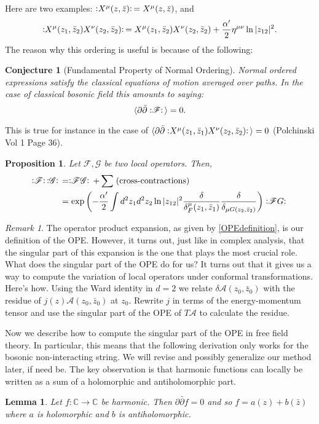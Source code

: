 \documentclass{report}
\theoremstyle{plain}
\newtheorem{lemma}[theorem]{Lemma}
\newtheorem{proposition}[theorem]{Proposition}
\newtheorem{conjecture}[theorem]{Conjecture}
\theoremstyle{definition}
\theoremstyle{remark}
\newtheorem*{remark}{Remark}
\newcommand{\FR}[2]{\frac{#1}{#2}}
\newcommand{\ms}{\mathscr}
\newcommand{\di}{\partial}
\newcommand{\NO}[1]{\vcentcolon\mathrel{#1}\vcentcolon\,}
\newcommand{\bC}{\mathbb{C}}
\begin{document}
Here are two examples: $\NO{X^\mu(z,\bar z)} = X^\mu(z,\bar z)$,
and
\begin{align}
\label{normalorder-example}
\NO{X^\mu(z_1,\bar z_2) X^\nu(z_2,\bar z_2)} = X^\mu(z_1,\bar
z_2) X^\nu(z_2,\bar z_2) + \FR{\alpha'}{2}\eta^{\mu\nu}\ln|z_{12}|^2.
\end{align}
The reason why this ordering is useful is because of the following:
\begin{conjecture}[Fundamental Property of Normal Ordering]
\label{fundamentalpropnormalorder}
Normal ordered expressions satisfy the classical
equations of motion averaged over paths. In the case of classical bosonic
field this amounts to saying:
\[ \braket{ \di\bar\di \NO{\ms F} } = 0.\]
\end{conjecture}
This is true for instance in the case of $\braket{\di\bar\di \NO{
X^\mu(z_1,\bar z_1) X^\nu(z_2,\bar z_2)}} = 0$ (Polchinski Vol 1 Page 36).
\begin{proposition} 
\label{prop-product-normal-order}
Let $\ms F,\ms G$ be two local operators. Then,
\begin{align}
 \NO{\ms F}\NO{\ms G} &=
\NO{\ms F\ms G} + \sum \;(\text{cross-contractions})\\
&= \exp\left( -\FR{\alpha'}{2}\int d^2z_1 d^2z_2 \ln|z_{12}|^2
\FR{\delta}{\delta^\mu_F(z_1,\bar z_1)}
\FR{\delta}{\delta_{\mu G(z_2,\bar z_2)}}
\right) \NO{\ms FG}
\end{align}
\end{proposition}

\begin{remark} \label{necessityOPE} The operator product expansion, as
given by \eqref{OPEdefinition}, is our definition of the OPE. However,
it turns out, just like in complex analysis, that the singular part of
this expansion is the one that plays the most crucial role. What does
the singular part of the OPE do for us? It turns out that it gives us a
way to compute the variation of local operators under conformal
transformations. Here's how.  Using the Ward identity in $d=2$ we
relate $\delta\ms A(z_0,\bar z_0)$ with the residue of $j(z)\ms
A(z_0,\bar z_0)$ at $z_0$. Rewrite $j$ in terms of the energy-momentum
tensor and use the singular part of the OPE of $T\ms A$ to calculate
the residue.
\end{remark}

Now we describe how to compute the singular part of the OPE in free field
theory. In particular, this means that the following derivation only works
for the bosonic non-interacting string. We will revise and possibly
generalize our method later, if need be. The key observation is that
harmonic functions can locally be written as a sum of a holomorphic and
antiholomorphic part.
\begin{lemma} Let $f : \bC \to \bC$ be harmonic. Then $\di\bar\di f = 0$
and so $f = a(z) + b(\bar z)$ where $a$ is holomorphic and $b$ is
antiholomorphic.
\end{lemma}
\end{document}
